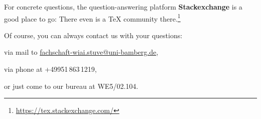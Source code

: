 For concrete questions, the question-answering platform \textbf{Stackexchange} is a good place to go: There even is a \TeX{} community there.\footnote{\url{https://tex.stackexchange.com/}}

Of course, you can always contact us with your questions:
\begin{compactitem}
	\item via mail to \href{mailto:fachschaft-wiai.stuve@uni-bamberg.de}{fachschaft-wiai.stuve@uni-bamberg.de},
	\item via phone at +49951\,863\,1219,
	\item or just come to our bureau at WE5/02.104.
\end{compactitem}


